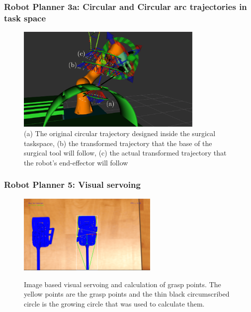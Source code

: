 \begin{frame}
\frametitle{Robot Planner 3a: Circular and Circular arc trajectories in task space}
\begin{center}
\begin{figure}[!htb]
\centering
\includegraphics[width=0.8\textwidth]{../images/robot_planner3/3a_circle_details.png}
\caption{(a) The original circular trajectory designed inside the surgical taskspace, (b) the transformed trajectory that the base of the surgical tool will
 follow, (c) the actual transformed trajectory that the robot's end-effector will follow}
\label{robot-planner3a-circle-details}
\end{figure}
\end{center}
\end{frame}


\begin{frame}
\frametitle{Robot Planner 5: Visual servoing}
\begin{center}
\begin{figure}[!htb]
\centering
\includegraphics[width=0.6\textwidth]{../images/grasp-points-triangle.png}\\
\caption{Image based visual servoing and calculation of grasp points. The yellow points are the grasp points and the thin black circumscribed circle is the growing circle that was used to calculate them.}
\end{figure}
\end{center}
\end{frame}

